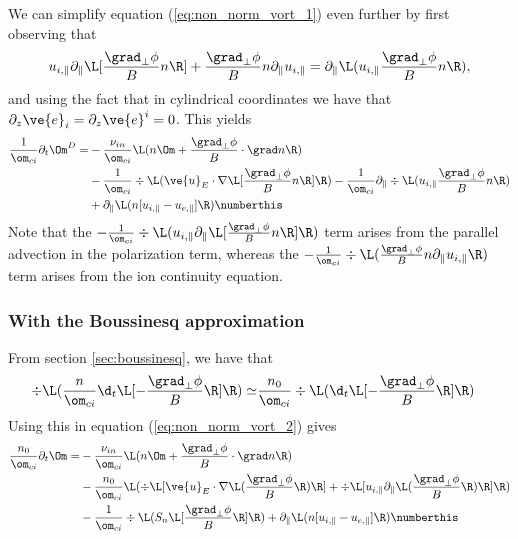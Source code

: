 We can simplify equation (\ref{eq:non_norm_vort_1}) even further by first
observing that
%
\begin{align*}
u_{i,\|}\partial_\|\L[\frac{\grad_\perp \phi}{B}n\R]
+ \frac{\grad_\perp \phi}{B} n \partial_\| u_{i,\|}
=
\partial_\| \L( u_{i,\|}\frac{\grad_\perp \phi}{B}n \R),
\end{align*}
%
and using the fact that in cylindrical coordinates we have that
$\partial_z \ve{e}_i = \partial_z \ve{e}^i = 0$. This yields
%
\begin{align*}
  \frac{1}{\om_{ci}}
  \partial_t \Om^D
  =&
  - \frac{\nu_{in}}{\om_{ci}} \L(n\Om + \frac{\grad_\perp \phi}{B} \cdot \grad n\R)
  \\
  &
  - \frac{1}{\om_{ci}} \div
 \L(
 \ve{u}_E\cdot\nabla \L[\frac{\grad_\perp \phi}{B}n \R]
 \R)
  - \frac{1}{\om_{ci}} \partial_\|\div
 \L( u_{i,\|}\frac{\grad_\perp \phi}{B}n \R)
 \\
 &
 + \partial_\| \L(n [u_{i,\|} - u_{e,\|}]\R)
 \numberthis
 \label{eq:non_norm_vort_2}
\end{align*}
%
Note that the
%
$ - \frac{1}{\om_{ci}} \div
\L( u_{i,\|}\partial_\|\L[\frac{\grad_\perp \phi}{B}n\R] \R) $
%
term arises from the parallel advection in the polarization term, whereas the
%
$ - \frac{1}{\om_{ci}} \div
 \L( \frac{\grad_\perp \phi}{B} n \partial_\| u_{i,\|} \R) $
%
term arises from the ion continuity equation.


\subsubsection{With the Boussinesq approximation}
%
From section \ref{sec:boussinesq}, we have that
%
\begin{align*}
    \div\L(\frac{n}{\om_{ci}}\d_t\L[-\frac{\grad_\perp \phi}{B}\R]\R)
    \simeq&
    \frac{n_0}{\om_{ci}}\div\L(\d_t\L[-\frac{\grad_\perp \phi}{B}\R]\R)
\end{align*}
%
Using this in equation (\ref{eq:non_norm_vort_2}) gives
%
\begin{align*}
  \frac{n_0}{\om_{ci}}
  \partial_t \Om
  =&
  - \frac{\nu_{in}}{\om_{ci}} \L(n\Om + \frac{\grad_\perp \phi}{B} \cdot \grad n\R)
  \\
  &
  - \frac{n_0}{\om_{ci}}
    \L(
    \div\L[ \ve{u}_E\cdot\nabla \L(\frac{\grad_\perp \phi}{B} \R) \R]
    + \div\L[u_{i,\|}\partial_\|\L(\frac{\grad_\perp \phi}{B}\R)\R]
    \R)
 \\
 &
- \frac{1}{\om_{ci}}
    \div \L( S_n \L[ \frac{ \grad_\perp \phi }{ B } \R] \R)
 + \partial_\| \L(n [u_{i,\|} - u_{e,\|}]\R)
 \numberthis
 \label{eq:boussinesq_non_norm}
\end{align*}
%


